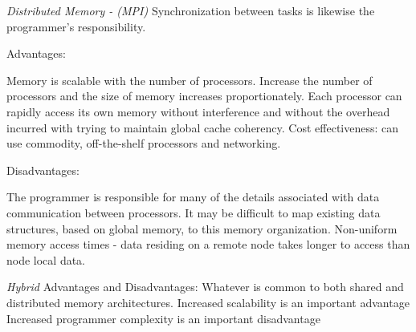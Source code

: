 \emph{Distributed Memory - (MPI)}
Synchronization between tasks is likewise the programmer's responsibility.

Advantages:

Memory is scalable with the number of processors. Increase the number of processors and the size of memory increases proportionately.
Each processor can rapidly access its own memory without interference and without the overhead incurred with trying to maintain global cache coherency.
Cost effectiveness: can use commodity, off-the-shelf processors and networking.

Disadvantages:

The programmer is responsible for many of the details associated with data communication between processors.
It may be difficult to map existing data structures, based on global memory, to this memory organization.
Non-uniform memory access times - data residing on a remote node takes longer to access than node local data.

\emph{Hybrid}
Advantages and Disadvantages:
  Whatever is common to both shared and distributed memory architectures.
  Increased scalability is an important advantage
  Increased programmer complexity is an important disadvantage
